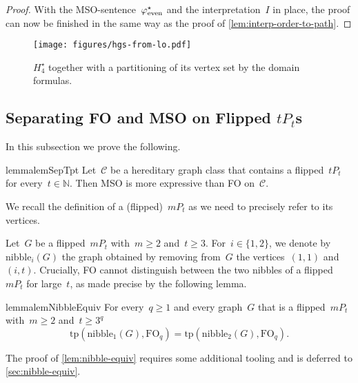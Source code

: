 \documentclass[11pt]{article}      \usepackage[margin=1in]{geometry}  \usepackage{microtype}
\theoremstyle{definition}
\newcommand{\N}[0]{\mathrm{\mathbb{N}}}
\newcommand{\tp}{\mathrm{tp}}
\newcommand{\FO}{\mathrm{FO}}
\newcommand{\CC}{\mathcal{C}}
\renewcommand{\ge}{\geqslant}
\renewcommand{\geq}{\ge}
\begin{document}
\begin{proof}
    With the MSO-sentence~$\varphi_{\mathrm{even}}^\star$ and the interpretation~$I$ in place, the proof can now be finished in the same way as the proof of \cref{lem:interp-order-to-path}.
\end{proof}


\begin{figure}[htbp]
    \centering
    \texttt{[image: figures/hgs-from-lo.pdf]}
    \caption{$H^\star_4$ together with a partitioning of its vertex set by the domain formulas.}
    \label{fig:hgs-from-lo}
\end{figure}
 
\subsection{Separating FO and MSO on Flipped \texorpdfstring{$tP_t$}{tPt}s}

In this subsection we prove the following.

\begin{restatable}{lemma}{lemSepTpt}
    \label{lem:sep-tpt}
    Let~$\CC$ be a hereditary graph class that contains a flipped~$tP_t$ for every~$t\in\N$.
    Then MSO is more expressive than FO on~$\CC$.
\end{restatable}


We recall the definition of a (flipped)~$mP_t$ as we need to precisely refer to its vertices.

\newcommand{\nibble}{\mathrm{nibble}}
Let~$G$ be a flipped~$mP_t$ with~$m\geq 2$ and~$t \geq 3$.
For~$i \in \{1,2\}$, we denote by~$\nibble_i(G)$ the graph obtained by removing from~$G$ the vertices~$(1,1)$ and~$(i,t)$.
Crucially, FO cannot distinguish between the two nibbles of a flipped~$mP_t$ for large~$t$, as made precise by the following lemma.

\begin{restatable}{lemma}{lemNibbleEquiv}
    \label{lem:nibble-equiv}
    For every~$q\geq 1$ and every graph~$G$ that is a flipped~$mP_t$ with~$m\geq 2$ and~$t \geq 3^q$
    \[
        \tp(\nibble_1(G),\FO_q) = \tp(\nibble_2(G),\FO_q).
    \]
\end{restatable}

The proof of \cref{lem:nibble-equiv} requires some additional tooling and is deferred to \cref{sec:nibble-equiv}.
\end{document}
